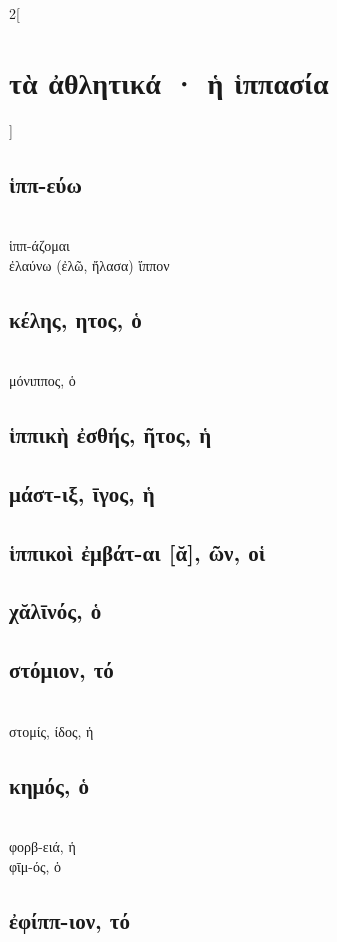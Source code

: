 \documentclass{book}
\begin{document}
\begin{multicols}{2}[\section{τὰ ἀθλητικά · ἡ ἱππασία}]
\subsection{ἱππ-εύω}
 ~\\
ἱππ-άζομαι
 ~\\
ἐλαύνω (ἐλῶ, ἤλασα) ἵππον
\subsection{κέλης, ητος, ὁ}  ~\\
μόνιππος, ὁ
\subsection{ἱππικὴ ἐσθής, ῆτος, ἡ}
\subsection{μάστ-ιξ, ῑγος, ἡ}
\subsection{ἱππικοὶ ἐμβάτ-αι [ᾰ], ῶν, οἱ}
\subsection{χᾰλῑνός, ὁ}
\subsection{στόμιον, τό}  ~\\
στομίς, ίδος, ἡ 
\subsection{κημός, ὁ}  ~\\
φορβ-ειά, ἡ  ~\\
φῑμ-ός, ὁ 
\subsection{ἐφίππ-ιον, τό}

\end{multicols}
\end{document}
